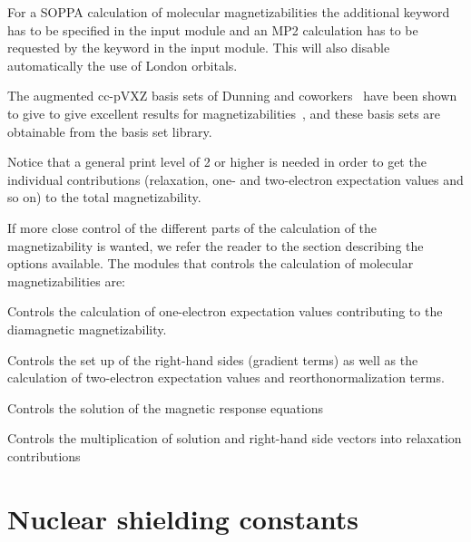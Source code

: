 For a SOPPA calculation of molecular magnetizabilities the 
additional 
keyword  has to be specified in the  input module 
and an MP2 calculation has to be requested by the keyword  in the 
 input module. This will also disable automatically
the use of London orbitals.

The augmented cc-pVXZ basis sets of Dunning and
coworkers~\cite{thdjcp90,rakthdrjhjcp96,dewthdjcp98,dewthdjcp100} have
been shown to give  to give excellent results for
magnetizabilities~\cite{krthklbpjhjajjcp99,krthpjklbcpl223,krhsthklbpjjacs116},
and these basis sets are obtainable from the basis set library.

Notice that a general print level of 2 or higher is needed in order to
get the individual contributions (relaxation, one- and
two-electron expectation values and so on) to the total magnetizability.

If more close control of the different parts of the calculation of the
magnetizability is wanted, we refer the reader to the section
describing the options available. The modules that controls the
calculation of molecular magnetizabilities are:

\begin{list}{}{\itemsep 0.10cm \parsep 0.0cm}
\item[\Sec{EXPECT}] Controls the calculation of one-electron
expectation values contributing to the diamagnetic magnetizability.
\item[\Sec{GETSGY}] Controls the set up of the right-hand sides
(gradient terms) as well as the calculation of two-electron
expectation values and reorthonormalization terms.
\item[\Sec{LINRES}] Controls the solution of the magnetic response
equations
\item[\Sec{RELAX}] Controls the multiplication of solution and right-hand
side vectors into relaxation contributions
\end{list}

\section{Nuclear shielding constants}\label{sec:shieldings}

\begin{center}
\end{center}


